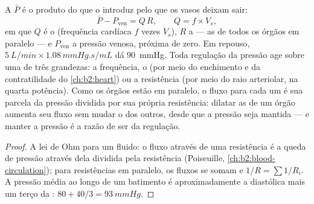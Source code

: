 \begin{theorem}\label{thm:b2:blood-pressure:equation}
A  $\bar P$ é o produto do que o  introduz
pelo que os vasos deixam sair:
\[
\bar P - P_{\text{ven}} = Q\,R, \qquad Q = f\times V_s,
\]
em que $Q$ é o  (frequência cardíaca $f$ vezes  $V_s$), $R$ a  --- as 
de todos os órgãos em paralelo --- e $P_{\text{ven}}$ a pressão venosa,
próxima de zero. Em repouso, $\qty{5}{L/min}\times\qty{1.08}{mmHg.s/mL}$
dá \qty{90}{mmHg}. Toda regulação da pressão age sobre uma de três
grandezas: a frequência, o  (por meio do enchimento e
da contratilidade do \cref{ch:b2:heart}) ou a resistência (por meio do raio
arteriolar, na quarta potência). Como os órgãos estão em paralelo, o
fluxo para cada um é sua parcela da pressão dividida por sua própria
resistência: dilatar as  de um órgão aumenta seu fluxo sem
mudar o dos outros, desde que a pressão seja mantida --- e manter a
pressão é a razão de ser da regulação.
\end{theorem}
\begin{proof}
A lei de Ohm para um fluido: o fluxo através de uma resistência é a
queda de pressão através dela dividida pela resistência (Poiseuille,
\cref{ch:b2:blood-circulation}); para resistências em paralelo, os fluxos se somam e
$1/R = \sum 1/R_i$. A pressão média ao longo de um batimento é
aproximadamente a diastólica mais um terço da :
$80 + 40/3 = \qty{93}{mmHg}$.
\end{proof}

